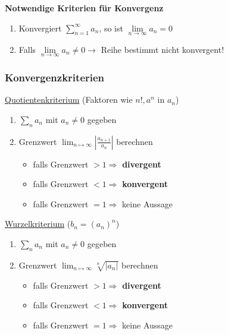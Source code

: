\documentclass[6pt]{article}
\begin{document}
\begin{multicols*}{3}
{\bf Notwendige Kriterien f{\"u}r Konvergenz} \\
\begin{enumerate}[label=(\roman*)]
	\vspace{-5mm}
	\item Konvergiert $\sum_{n=1}^\infty a_n$, so ist $\lim\limits_{n \to \infty}  a_n = 0$
	\item Falls $\lim\limits_{n \to \infty}  a_n \not = 0 \longrightarrow $ Reihe bestimmt nicht konvergent!
\end{enumerate}

\subsubsection*{Konvergenzkriterien}

	\underline{Quotientenkriterium} (Faktoren wie $n!, a^n $ in $a_n$)\\
	\vspace{-5mm}
	\begin{enumerate}
		\item $\sum_n a_n$ mit $a_n \neq 0$ gegeben
		\item Grenzwert $\lim_{n\mapsto\infty}|\frac{a_{n+1}}{a_n}|$ berechnen
		\begin{itemize}
			\item falls Grenzwert $> 1 \Rightarrow$ \textbf{divergent}
			\item falls Grenzwert $< 1 \Rightarrow$ \textbf{konvergent}
			\item falls Grenzwert $= 1 \Rightarrow$ keine Aussage
		\end{itemize}
	\end{enumerate}
	\vspace{2mm}
	
	\underline{Wurzelkriterium} ($b_n = {(a_n)}^n$) \\
	\vspace{-5mm}
	\begin{enumerate}
		\item $\sum_n a_n$ mit $a_n \neq 0$ gegeben
		\item Grenzwert $\lim_{n\mapsto\infty}\sqrt[n]{|a_n|}$ berechnen
		\begin{itemize}
			\item falls Grenzwert $> 1 \Rightarrow$ \textbf{divergent}
			\item falls Grenzwert $< 1 \Rightarrow$ \textbf{konvergent}
			\item falls Grenzwert $= 1 \Rightarrow$ keine Aussage
		\end{itemize}
	\end{enumerate}
	\vspace{2mm}
	

\end{multicols*}
\end{document}
